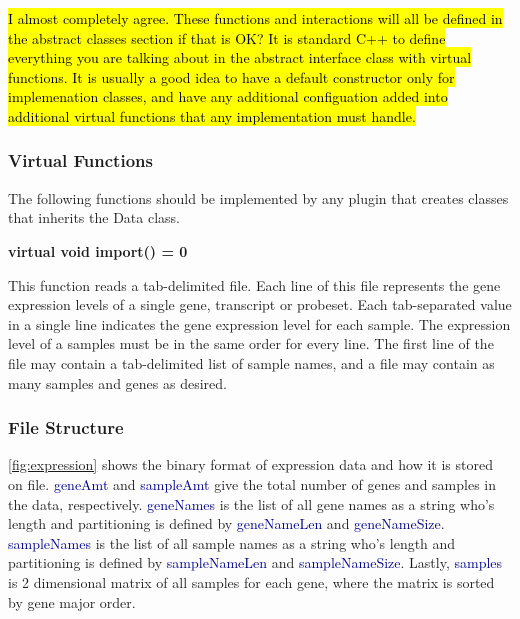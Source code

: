 \documentclass[10pt]{article}
\providecommand{\josh}[1]{\sethlcolor{lblue}\hl{#1}}
\providecommand{\h}[1]{\textcolor{darkblue}{#1}}
\begin{document}
\josh{I almost completely agree. These functions and interactions will all be 
defined in the abstract classes section if that is OK? It is standard C++ to 
define everything you are talking about in the abstract interface class with 
virtual functions. It is usually a good idea to have a default constructor only 
for implemenation classes, and have any additional configuation added into 
additional virtual functions that any implementation must handle.}

\subsubsection{Virtual Functions}

The following functions should be implemented by any plugin that creates
classes that inherits the Data class.

{\bfseries virtual void import() = 0}

This function reads a tab-delimited file.  Each line of this file
represents the gene expression levels of a single gene, transcript or probeset.
Each tab-separated value in a single line indicates the gene expression level 
for each sample. The expression level of a samples must be in the same 
order for every line.  The first line of the file may contain a tab-delimited
list of sample names, and a file may contain as many samples and genes as
desired.

\subsubsection{File Structure}

\autoref{fig:expression} shows the binary format of expression data and how it 
is stored on file. \h{geneAmt} and \h{sampleAmt} give the total number of genes 
and samples in the data, respectively. \h{geneNames} is the list of all gene 
names as a string who's length and partitioning is defined by \h{geneNameLen} 
and \h{geneNameSize}. \h{sampleNames} is the list of all sample names as a 
string who's length and partitioning is defined by \h{sampleNameLen} and 
\h{sampleNameSize}. Lastly, \h{samples} is 2 dimensional matrix of all samples 
for each gene, where the matrix is sorted by gene major order.
\end{document}
